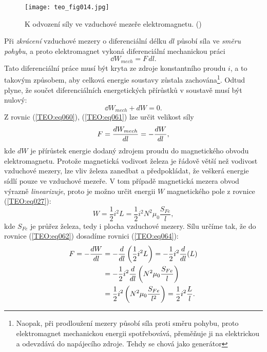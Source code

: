       \begin{figure}[ht!] %
        \centering
        \texttt{[image: teo\_fig014.jpg]}
        \caption{K odvození síly ve vzduchové mezeře elektromagnetu.
                 (\cite[s.~165]{Patocka4})}
        \label{teo:fig014}
      \end{figure}
      Při \emph{zkrácení} vzduchové mezery o diferenciální délku \(dl\) působí síla ve \emph{směru 
      pohybu}, a proto elektromagnet vykoná diferenciální mechanickou práci
      \begin{equation}\label{TEO:eq060}
        \dd{W_{mech}} = F\,dl.
      \end{equation}
      Tato diferenciální práce musí být kryta ze zdroje konstantního proudu \(i\), a to takovým 
      způsobem, aby celková energie soustavy zůstala zachována\footnote{Naopak, při prodloužení 
      mezery působí síla proti směru pohybu, proto elektromagnet mechanickou energii spotřebovává, 
      přeměňuje ji na elektrickou a odevzdává do napájecího zdroje. Tehdy se chová jako generátor}. 
      Odtud plyne, že součet diferenciálních energetických přírůstků v soustavě musí být nulový:
      \begin{equation}\label{TEO:eq061}
        \dd{W_{mech}} + dW = 0.
      \end{equation}
      Z rovnic (\ref{TEO:eq060}), (\ref{TEO:eq061}) lze určit velikost síly 
      \begin{equation}\label{TEO:eq062}
        F = \dfrac{d W_{mech}}{d l} = - \dfrac{d W}{d l},
      \end{equation}
      kde \(dW\) je přírůstek energie dodaný zdrojem proudu do magnetického obvodu elektromagnetu. 
      Protože magnetická vodivost železa je řádově větší než vodivost vzduchové mezery, lze vliv 
      železa zanedbat a předpokládat, že veškerá energie sídlí pouze ve vzduchové mezeře. V tom 
      případě magnetická mezera obvod výrazně \emph{linearizuje}, proto je možno určit energii 
      \(W\) magnetického pole z rovnice (\ref{TEO:eq027}): 
      \begin{equation}\label{TEO:eq064}
        W = \frac{1}{2}i^2L = \frac{1}{2}i^2N^2\mu_0\frac{S_{Fe}}{l},
      \end{equation}
      kde \(S_{Fe}\) je průřez železa, tedy i plocha vzduchové mezery. Sílu určíme tak, že do 
      rovnice (\ref{TEO:eq062}) dosadíme rovnici (\ref{TEO:eq064}):
      \begin{align}
        F = - \dfrac{d W}{d l} 
         &= -\dfrac{d  }{d l}\left(\frac{1}{2}i^2L\right)= -\frac{1}{2}i^2\dfrac{d  }{d l}(L) \nonumber \\
         &= -\frac{1}{2}i^2\dfrac{d  }{d l}\left(N^2\mu_0\frac{S_{Fe}}{l}\right)        \nonumber \\
         &=  \frac{1}{2}i^2\left(N^2\mu_0\frac{S_{Fe}}{l^2}\right)
          =  \frac{1}{2}i^2\frac{L}{l}.                                           \label{TEO:eq065}
      \end{align}
